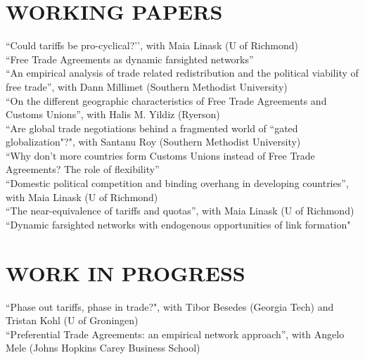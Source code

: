 \documentclass[11pt]{res}
\begin{document}
\begin{resume}
\section{WORKING PAPERS}\vspace{1.5mm}
{``Could tariffs be pro-cyclical?'}', with Maia Linask (U of Richmond)\vspace{1.5mm}\\
{ ``Free Trade Agreements as dynamic farsighted networks''} \vspace{1.5mm}\\
{``An empirical analysis of trade related redistribution and the political viability of free trade''}, with Dann Millimet (Southern Methodist University)\vspace{1.5mm}\\
{``On the different geographic characteristics of Free Trade Agreements and Customs Unions''}, with Halis M. Yildiz (Ryerson)\vspace{1.5mm}\\
``Are global trade negotiations behind a fragmented world of ``gated globalization"?", with Santanu Roy (Southern Methodist University)\vspace{1.5mm}\\
{``Why don't more countries form Customs Unions instead of Free Trade Agreements? The role of flexibility''} \vspace{1.5mm}\\
{``Domestic political competition and binding overhang in developing countries''}, with Maia Linask (U of Richmond)\vspace{1.5mm}\\
{``The near-equivalence of tariffs and quotas''}, with Maia Linask (U of Richmond)\vspace{1.5mm}\\


\phantom{.}\vspace{.4cm}
{``Dynamic farsighted networks with endogenous opportunities of link formation"}\vspace{1mm}\\

\section{WORK IN PROGRESS}\vspace{1.5mm}
``Phase out tariffs, phase in trade?", with Tibor Besedes (Georgia Tech) and Tristan Kohl (U of Groningen) \vspace{1.5mm}\\
``Preferential Trade Agreements: an empirical network approach'', with Angelo Mele (Johns Hopkins Carey Business School)\\


\end{resume}
\end{document}

